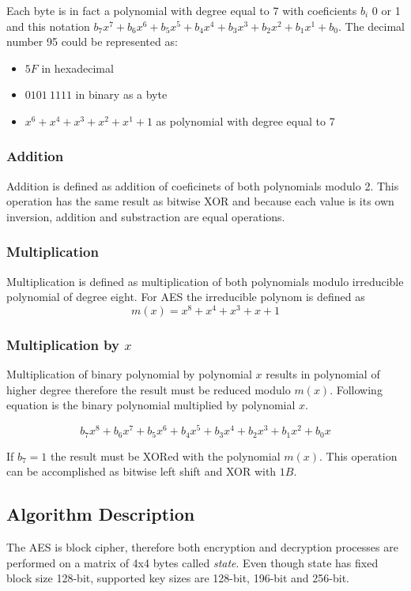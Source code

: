Each byte is in fact a polynomial with degree equal to 7 with coeficients
$b_i$ 0 or 1 and this notation $b_7x^7 + b_6x^6 + b_5x^5 + b_4x^4 + b_3x^3
+ b_2x^2 + b_1x^1 + b_0$. The decimal number 95 could be represented as:
\begin{itemize}
\item $5F$ in hexadecimal
\item $0101~1111$ in binary as a byte
\item $x^6 + x^4 + x^3 + x^2 + x^1 + 1$ as polynomial with degree equal to 7
\end{itemize}

\subsubsection*{Addition}
Addition is defined as addition of coeficinets of both polynomials modulo
2. This operation has the same result as bitwise XOR and because 
each value is its own inversion, addition and substraction are equal
operations.

\subsubsection*{Multiplication}
Multiplication is defined as multiplication of both polynomials modulo
irreducible polynomial of degree eight. For AES the irreducible polynom
is defined as
\begin{equation}
m(x) = x^8 + x^4 + x^3 + x + 1
\end{equation}

\subsubsection*{Multiplication by $x$}
Multiplication of binary polynomial by polynomial $x$ results in polynomial of
higher degree therefore the result must be reduced modulo $m(x)$. Following
equation is the binary polynomial multiplied by polynomial $x$.

\begin{equation}
b_7x^8+b_6x^7+b_5x^6+b_4x^5+b_3x^4+b_2x^3+b_1x^2+b_0x
\end{equation} 

If $b_7 = 1$ the result must be XORed with the polynomial $m(x)$. This operation
can be accomplished as bitwise left shift and XOR with $1B$.

\subsection{Algorithm Description}
The AES is block cipher, therefore both encryption and decryption processes
are performed on a matrix of 4x4 bytes called \textit{state}. Even though
state has fixed block size 128-bit, supported key sizes are 128-bit, 196-bit
and 256-bit. 

